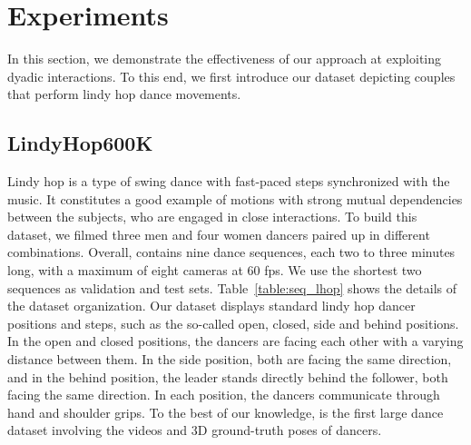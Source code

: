 \section{Experiments}

In this section, we demonstrate the effectiveness of our approach at exploiting dyadic interactions. To this end, we first introduce our \lindyhop{} dataset depicting couples that perform lindy hop dance movements.

\subsection{LindyHop600K}
Lindy hop is a type of swing dance with fast-paced steps synchronized with the music. It constitutes a good example of motions with strong mutual dependencies between the subjects, who are engaged in close interactions. To build this dataset, we filmed three men and four women dancers paired up in different combinations. Overall, \lindyhop{} contains nine dance sequences, each two to three minutes long, with a maximum of eight cameras at 60 fps. We use the shortest two sequences as validation and test sets. Table~\ref{table:seq_lhop} shows the details of the dataset organization. Our dataset displays standard lindy hop dancer positions and steps, such as the so-called open, closed, side and behind positions. In the open and closed positions, the dancers are facing each other with a varying distance between them. In the side position, both are facing the same direction, and in the behind position, the leader stands directly behind the follower, both facing the same direction. In each position, the dancers communicate through hand and shoulder grips. To the best of our knowledge, \lindyhop{} is the first large dance dataset involving the videos and 3D ground-truth poses of dancers.



